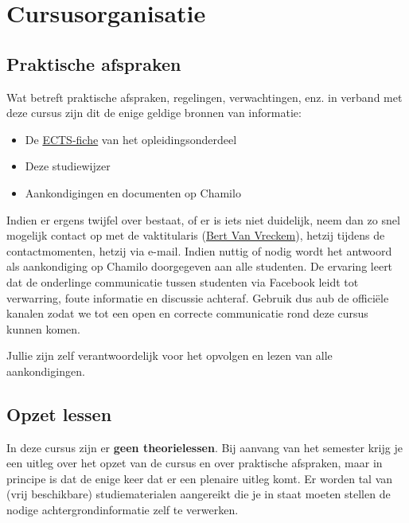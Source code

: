 \chapter{Cursusorganisatie}
\label{cursusorganisatie}

\section{Praktische afspraken}
\label{praktische-afspraken}

Wat betreft praktische afspraken, regelingen, verwachtingen, enz. in
verband met deze cursus zijn dit de enige geldige bronnen van
informatie:

\begin{itemize}
\item
  De
  \href{https://bamaflexweb.hogent.be/BMFUIDetailxOLOD.aspx?a=68521\&b=5\&c=1}{ECTS-fiche}
  van het opleidingsonderdeel
\item
  Deze studiewijzer
\item
  Aankondigingen en documenten op Chamilo
\end{itemize}

Indien er ergens twijfel over bestaat, of er is iets niet duidelijk,
neem dan zo snel mogelijk contact op met de vaktitularis
(\href{mailto:bert.vanvreckem@hogent.be}{Bert Van Vreckem}), hetzij
tijdens de contactmomenten, hetzij via e-mail. Indien nuttig of nodig
wordt het antwoord als aankondiging op Chamilo doorgegeven aan alle
studenten. De ervaring leert dat de onderlinge communicatie tussen
studenten via Facebook leidt tot verwarring, foute informatie en
discussie achteraf. Gebruik dus aub de officiële kanalen zodat we tot
een open en correcte communicatie rond deze cursus kunnen komen.

Jullie zijn zelf verantwoordelijk voor het opvolgen en lezen van alle
aankondigingen.

\section{Opzet lessen}
\label{opzet-lessen}

In deze cursus zijn er \textbf{geen theorielessen}. Bij aanvang van het
semester krijg je een uitleg over het opzet van de cursus en over
praktische afspraken, maar in principe is dat de enige keer dat er een
plenaire uitleg komt. Er worden tal van (vrij beschikbare) studiematerialen aangereikt die je in staat moeten stellen de nodige achtergrondinformatie zelf te verwerken.

